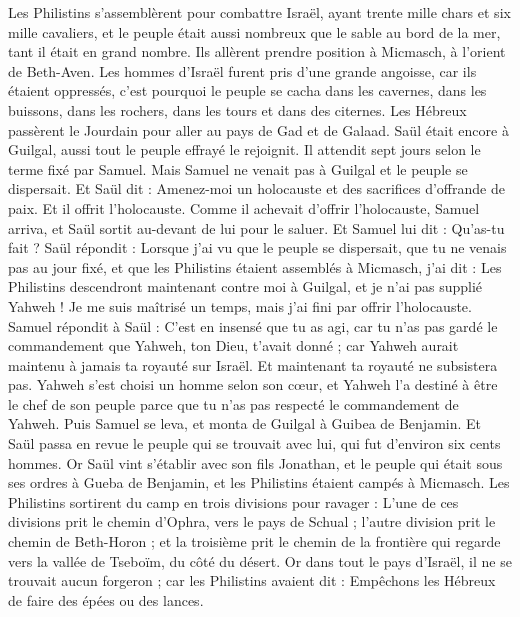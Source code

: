 \begin{multicols}{2}
Les Philistins s'assemblèrent pour combattre Israël, ayant trente mille chars et six mille cavaliers, et le peuple était aussi nombreux que le sable au bord de la mer, tant il était en grand nombre. Ils allèrent prendre position à Micmasch, à l'orient de Beth-Aven.
Les hommes d'Israël furent pris d'une grande angoisse, car ils étaient oppressés, c'est pourquoi le peuple se cacha dans les cavernes, dans les buissons, dans les rochers, dans les tours et dans des citernes.
Les Hébreux passèrent le Jourdain pour aller au pays de Gad et de Galaad. Saül était encore à Guilgal, aussi tout le peuple effrayé le rejoignit.
Il attendit sept jours selon le terme fixé par Samuel. Mais Samuel ne venait pas à Guilgal et le peuple se dispersait.
Et Saül dit : Amenez-moi un holocauste et des sacrifices d'offrande de paix. Et il offrit l'holocauste.
Comme il achevait d'offrir l'holocauste, Samuel arriva, et Saül sortit au-devant de lui pour le saluer.
Et Samuel lui dit : Qu'as-tu fait ? Saül répondit : Lorsque j'ai vu que le peuple se dispersait, que tu ne venais pas au jour fixé, et que les Philistins étaient assemblés à Micmasch,
j'ai dit : Les Philistins descendront maintenant contre moi à Guilgal, et je n'ai pas supplié Yahweh ! Je me suis maîtrisé un temps, mais j'ai fini par offrir l'holocauste.
Samuel répondit à Saül : C'est en insensé que tu as agi, car tu n'as pas gardé le commandement que Yahweh, ton Dieu, t'avait donné ; car Yahweh aurait maintenu à jamais ta royauté sur Israël.
Et maintenant ta royauté ne subsistera pas. Yahweh s'est choisi un homme selon son cœur, et Yahweh l'a destiné à être le chef de son peuple parce que tu n'as pas respecté le commandement de Yahweh.
Puis Samuel se leva, et monta de Guilgal à Guibea de Benjamin. Et Saül passa en revue le peuple qui se trouvait avec lui, qui fut d'environ six cents hommes.
Or Saül vint s'établir avec son fils Jonathan, et le peuple qui était sous ses ordres à Gueba de Benjamin, et les Philistins étaient campés à Micmasch.
Les Philistins sortirent du camp en trois divisions pour ravager : L'une de ces divisions prit le chemin d'Ophra, vers le pays de Schual ;
l'autre division prit le chemin de Beth-Horon ; et la troisième prit le chemin de la frontière qui regarde vers la vallée de Tseboïm, du côté du désert.
Or dans tout le pays d'Israël, il ne se trouvait aucun forgeron ; car les Philistins avaient dit : Empêchons les Hébreux de faire des épées ou des lances.

\end{multicols}
